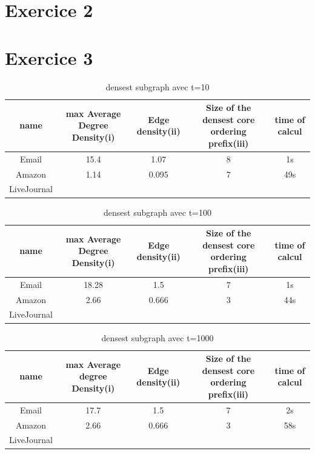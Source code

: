 \documentclass[a4paper,10pt]{report}
\begin{document}
\section{Exercice 2}

\section{Exercice 3}

\begin{table}[ht]
\caption{densest subgraph avec t=10}
\centering
\begin{tabular}{|c c c c c|}
\hline\hline
name & max Average Degree Density(i)&Edge density(ii)&Size of the densest core ordering prefix(iii) & time of calcul \\[0.5ex]
\hline

Email & 15.4 & 1.07 & 8 & 1s \\
Amazon & 1.14 & 0.095 & 7 & 49s \\
LiveJournal & &  &  &   \\

\hline
\end{tabular}
\label {table:nonlin}
\end{table}

\begin{table}[ht]
\caption{densest subgraph avec t=100}
\centering
\begin{tabular}{|c c c c c|}
\hline\hline
name & max Average Degree Density(i)&Edge density(ii)&Size of the densest core ordering prefix(iii) & time of calcul \\[0.5ex]
\hline

Email & 18.28 & 1.5 & 7 & 1s \\
Amazon & 2.66 & 0.666 & 3 & 44s \\
LiveJournal & &  &  &   \\

\hline
\end{tabular}
\label {table:nonlin}
\end{table}

\begin{table}[ht]
\caption{densest subgraph avec t=1000}
\centering
\begin{tabular}{|c c c c c|}
\hline\hline
name & max Average degree Density(i)&Edge density(ii)&Size of the densest core ordering prefix(iii) & time of calcul \\[0.5ex]
\hline

Email & 17.7 & 1.5 & 7 & 2s \\
Amazon & 2.66 & 0.666 & 3 & 58s \\
LiveJournal & &  &  &   \\

\hline
\end{tabular}
\label {table:nonlin}
\end{table}
\end{document}
